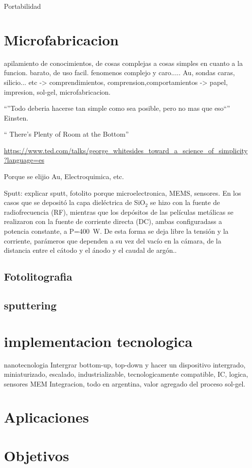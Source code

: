 Portabilidad

\section{Microfabricacion}\label{sec:microfabricacion}
apilamiento de conocimientos, de cosas complejas a cosas simples en cuanto a la funcion. barato, de uso facil.
fenomenos complejo y caro..... Au, sondas caras, silicio... etc -> comprendimientos, comprension,comportamientos -> papel, impresion, sol-gel, \cite{Whitesides2015,Burdass2010}microfabricacion.

``''Todo deberia hacerse tan simple como sea posible, pero no mas que eso``'' Einsten.

`` There's Plenty of Room at the Bottom''

\url{https://www.ted.com/talks/george_whitesides_toward_a_science_of_simplicity?language=es}\cite{ted_whitesides2010}

Porque se elijio Au, Electroquimica, etc.

Sputt: explicar sputt, fotolito porque microelectronica, MEMS, sensores.
En los casos que se depositó la capa dieléctrica de SiO$_2$ se hizo con la fuente de radiofrecuencia (RF), mientras que los depósitos de las películas metálicas se realizaron con la fuente de corriente directa (DC), ambas configuradass a potencia constante, a P=\SI{400}{\watt}.  De esta forma se deja libre la tensión y la corriente, parámeros que dependen a su vez del vacío en la cámara, de la distancia entre el cátodo y el ánodo y el caudal de argón.\cite{sigmund1968}. 

\subsection{Fotolitografia}\label{sec:intro_fotolito}

\subsection{sputtering}

\section{implementacion tecnologica}
nanotecnologia\cite{Gimenez2017}
Intergrar bottom-up, top-down y hacer un dispositivo intergrado, miniaturizado, escalado, industrializable, tecnologicamente compatible, IC, logica, sensores MEM
Integracion, todo en argentina, valor agregado del proceso sol-gel.\cite{Volksen2010}

\section{Aplicaciones}

\section{Objetivos}